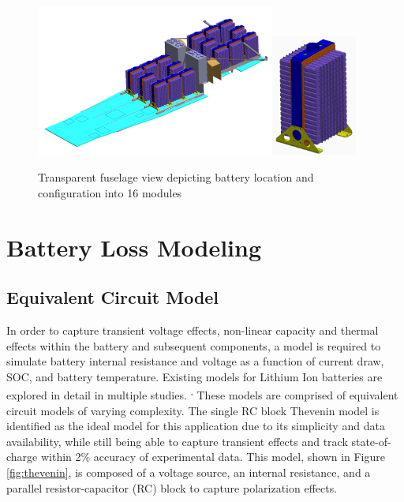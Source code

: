 \documentclass[]{aiaa-tc}%
\begin{document}
\begin{figure}[!htb]%
	\centering
	\includegraphics[width=0.7\textwidth]{figures/pallet.png}\includegraphics[width=0.25\textwidth]{figures/block.png}
	\caption{Transparent fuselage view depicting battery location and configuration into 16 modules}
	\label{fig:pallet}
\end{figure}


\section{Battery Loss Modeling} \label{BLM}

\subsection{Equivalent Circuit Model}

In order to capture transient voltage effects, non-linear capacity and thermal effects within the battery and subsequent components, a model is required to simulate battery internal resistance and voltage as a function of current draw, SOC, and battery temperature. 
Existing models for Lithium Ion batteries are explored in detail in multiple studies. \cite{Huria}\textsuperscript{,} \cite{Hongwen} These models are comprised of equivalent circuit models of varying complexity. The single RC block Thevenin model is identified as the ideal model for this application due to its simplicity and data availability, while still being able to capture transient effects and track state-of-charge within 2\% accuracy of experimental data. This model, shown in Figure \ref{fig:thevenin}, is composed of a voltage source, an internal resistance, and a parallel resistor-capacitor (RC) block to capture polarization effects. 
\end{document}
